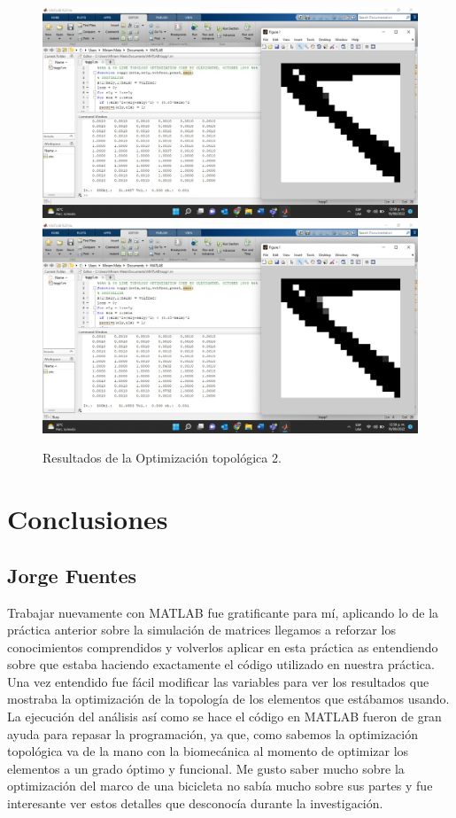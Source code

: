 \documentclass{article}
\begin{document}
\begin{figure}[htp]
\centering
   { \includegraphics[width=1\textwidth]{3.jpeg}}
    {\includegraphics[width=1\textwidth]{4.jpeg}}
  \caption{Resultados de la Optimización topológica 2.}
\end{figure}
   
 \newpage
\section{Conclusiones}
\subsection{Jorge  Fuentes}
Trabajar nuevamente con MATLAB fue gratificante para mí, aplicando lo de la práctica anterior sobre la simulación de matrices llegamos a reforzar los conocimientos comprendidos y volverlos aplicar en esta práctica as entendiendo sobre que estaba haciendo exactamente el código utilizado en nuestra práctica. Una vez entendido fue fácil modificar las variables para ver los resultados que mostraba la optimización de la topología de los elementos que estábamos usando. La ejecución del análisis así como se hace el código en MATLAB fueron de gran ayuda para repasar la programación, ya que, como sabemos la optimización topológica va de la mano con la biomecánica al momento de optimizar los elementos a un grado óptimo y funcional. Me gusto saber mucho sobre la optimización del marco de una bicicleta no sabía mucho sobre sus partes y fue interesante ver estos detalles que desconocía durante la investigación.
\end{document}
